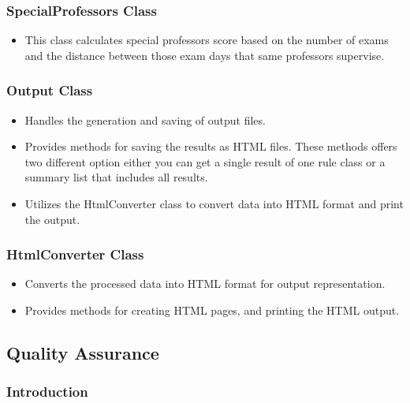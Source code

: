 \subsubsection{SpecialProfessors Class}


\begin{itemize}
\item This class calculates special professors score based on the number of exams and the distance between those exam days that same professors supervise.

\end{itemize}






\subsubsection{Output Class}


\begin{itemize}
\item Handles the generation and saving of output files.
\item Provides methods for saving the results as HTML files. These methods offers two different option either you can get a single result of one rule class or a summary list that includes all results.
\item Utilizes the HtmlConverter class to convert data into HTML format and print the output.
\end{itemize}


\subsubsection{HtmlConverter Class}


\begin{itemize}
\item Converts the processed data into HTML format for output representation.
\item Provides methods for creating HTML pages, and printing the HTML output.

\end{itemize}




 \subsection{Quality Assurance}
 
 \subsubsection{Introduction}

